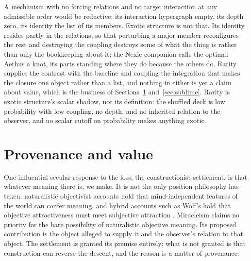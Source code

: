 A mechanism with no forcing relations and no target interaction at any
admissible order would be reductive: its interaction hypergraph empty, its
depth zero, its identity the list of its members. Exotic structure is not
that. Its identity resides partly in the relations, so that perturbing a major
member reconfigures the rest and destroying the coupling destroys some of what
the thing is rather than only the bookkeeping about it; the Nexic companion
calls the optimal Aethus a knot, its parts standing where they do because the
others do. Rarity supplies the contrast with the baseline and coupling the
integration that makes the closure one object rather than a list, and nothing
in either is yet a claim about value, which is the business of
Sections~\ref{sec:construction} and~\ref{sec:sublime}. Rarity is exotic
structure's scalar shadow, not its definition: the shuffled deck is low
probability with low coupling, no depth, and no inherited relation to the
observer, and no scalar cutoff on probability makes anything exotic.

\section{Provenance and value}\label{sec:construction}

One influential secular response to the loss, the constructionist settlement,
is that whatever meaning there is, we make. It is not the only position
philosophy has taken: naturalistic objectivist accounts hold that
mind-independent features of the world can confer meaning, and hybrid accounts
such as Wolf's hold that objective attractiveness must meet subjective
attraction \cite{Wolf10,MetzSEP}. Miracleism claims no priority for the bare
possibility of naturalistic objective meaning. Its proposed contribution is
the object alleged to supply it and the observer's relation to that object.
The settlement is granted its premise entirely; what is not granted is that
construction can reverse the descent, and the reason is a matter of
provenance.

